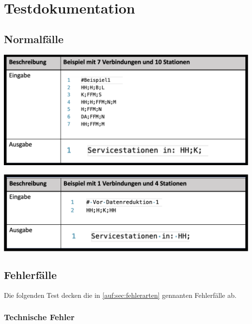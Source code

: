 \chapter{Testdokumentation}\label{ch:testdokumentation}


\section{Normalfälle}\label{test:sec:normalfaelle}
\begin{center}
    \includegraphics[width=\linewidth]{images/Tests/IHK-Beispiele/Beispiel1.png}
    \label{test:subsecpar:beispiel1}
\end{center}

\begin{center}
    \includegraphics[width=\linewidth]{images/Tests/IHK-Beispiele/Datenreduktion1.png}
    \label{test:subsecpar:beispiel1}
\end{center}

\section{Fehlerfälle}\label{test:sec:fehlerfaelle}
Die folgenden Test decken die in \ref{auf:sec:fehlerarten} gennanten Fehlerfälle ab.

\subsection{Technische Fehler}\label{test:sec:technische-fehler}
